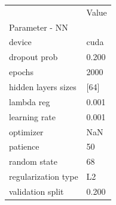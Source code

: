 \begin{tabular}{ll}
\toprule
 & Value \\
Parameter - NN &  \\
\midrule
device & cuda \\
dropout prob & 0.200 \\
epochs & 2000 \\
hidden layers sizes & [64] \\
lambda reg & 0.001 \\
learning rate & 0.001 \\
optimizer & NaN \\
patience & 50 \\
random state & 68 \\
regularization type & L2 \\
validation split & 0.200 \\
\bottomrule
\end{tabular}
